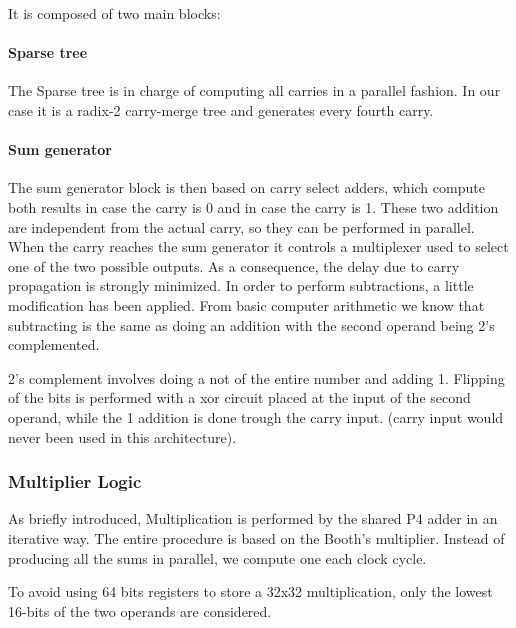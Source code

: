 \documentclass[12pt]{article}
\begin{document}
It is composed of two main blocks: 
\paragraph{Sparse tree}The Sparse tree is in charge of computing all carries in a parallel fashion. In our case it is a radix-2 carry-merge tree and generates every fourth carry. 

\paragraph{Sum generator}The sum generator block is then based on carry select adders, which compute both results in case the carry is 0 and in case the carry is 1. These two addition are independent from the actual carry, so they can be performed in parallel. When the carry reaches the sum generator it controls a multiplexer used to select one of the two possible outputs.
As a consequence, the delay due to carry propagation is strongly minimized.
\newline
\newline
In order to perform subtractions, a little modification has been applied. From basic computer arithmetic we know that subtracting is the same as doing an addition with the second operand being 2's complemented.

2's complement involves doing a not of the entire number and adding 1.
Flipping of the bits is performed with a xor circuit placed at the input of the second operand, while the 1 addition is done trough the carry input. (carry input would never been used in this architecture). 



\subsubsection{Multiplier Logic}
As briefly introduced, Multiplication is performed by the shared P4 adder in an iterative way.
The entire procedure is based on the Booth's multiplier. Instead of producing all the sums in parallel, we compute one each clock cycle.

To avoid using 64 bits registers to store a 32x32 multiplication, only the lowest 16-bits of the two operands are considered.
\end{document}
